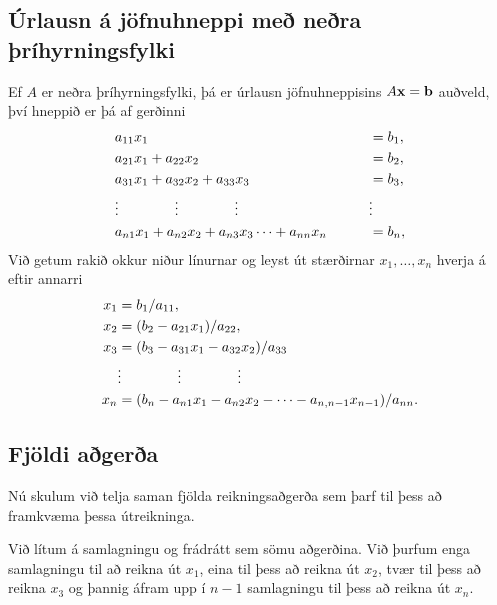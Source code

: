 \documentclass[letterpaper,10pt,icelandic]{sphinxmanual}
\begin{document}
\subsection{Úrlausn á jöfnuhneppi með neðra þríhyrningsfylki}
\label{kafli08:urlausn-a-jofnuhneppi-me-nera-rihyrningsfylki}
Ef \(A\) er neðra þríhyrningsfylki, þá er úrlausn jöfnuhneppisins
\(A\mbox{${\bf x}$}= \mbox{${\bf b}$}\) auðveld, því hneppið er þá
af gerðinni
\begin{gather}
\begin{split}\begin{aligned}
    &a_{11}x_1&&=b_1,\\
    &a_{21}x_1+a_{22}x_2&&=b_2,\\
    &a_{31}x_1+a_{32}x_2+a_{33}x_3&&=b_3,\\
    &\vdots \qquad \qquad   \vdots \qquad
    \qquad \vdots& \qquad& \vdots\\
    &a_{n1}x_1+a_{n2}x_2+a_{n3}x_3\cdots+a_{nn}x_n&&=b_n,\end{aligned}\end{split}\notag
\end{gather}
Við getum rakið okkur niður línurnar og leyst út stærðirnar
\(x_1,\dots,x_n\) hverja á eftir annarri
\begin{gather}
\begin{split}\begin{aligned}
    x_1& = b_1/a_{11},\\
    x_2& = (b_2-a_{21}x_1)/a_{22},\\
    x_3& = (b_3-a_{31}x_1-a_{32}x_2)/a_{33}\\
    &\vdots \qquad \qquad \vdots \qquad \qquad \vdots\\
    x_n& = (b_n-a_{n1}x_1-a_{n2}x_2-\cdots
        -a_{n,n-1}x_{n-1})/a_{nn}.\end{aligned}\end{split}\notag
\end{gather}

\subsection{Fjöldi aðgerða}
\label{kafli08:id2}
Nú skulum við telja saman fjölda reikningsaðgerða sem þarf til þess að
framkvæma þessa útreikninga.

Við lítum á samlagningu og frádrátt sem sömu aðgerðina. Við þurfum enga
samlagningu til að reikna út \(x_1\), eina til þess að reikna út
\(x_2\), tvær til þess að reikna \(x_3\) og þannig áfram upp í
\(n-1\) samlagningu til þess að reikna út \(x_n\).
\end{document}

